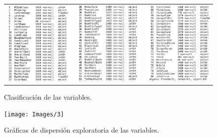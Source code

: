 \begin{figure}[H]
	\begin{tabular}{ccc}
		\includegraphics[width=45mm]{Images/1.1} &   \includegraphics[width=45mm]{Images/1.2}&   \includegraphics[width=45mm]{Images/1.3} \\
	\end{tabular}
	\caption{Clasificación de las variables.}
		\label{fig:2}
\end{figure}

\begin{figure}[H]
	\centering 
	\texttt{[image: Images/3]}
	\caption{Gráficas de dispersión exploratoria de las variables.}
		\label{fig:3}
\end{figure}

